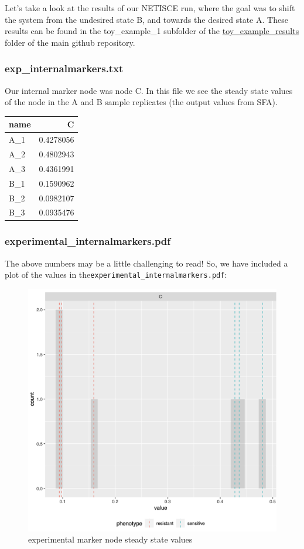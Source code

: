 \documentclass[
]{book}
\theoremstyle{definition}
\theoremstyle{definition}
\theoremstyle{definition}
\theoremstyle{definition}
\theoremstyle{remark}
\begin{document}
Let's take a look at the results of our NETISCE run, where the goal was to shift the system from the undesired state B, and towards the desired state A. These results can be found in the toy\_example\_1 subfolder of the \href{https://github.com/VeraLiconaResearchGroup/Netisce/tree/main/toy_example_results}{toy\_example\_results} folder of the main github repository.

\hypertarget{section-id}{%
\subsubsection*{exp\_internalmarkers.txt}\label{section-id}}

Our internal marker node was node C. In this file we see the steady state values of the node in the A and B sample replicates (the output values from SFA).

\begin{tabular}{l|r}
\hline
name & C\\
\hline
A\_1 & 0.4278056\\
\hline
A\_2 & 0.4802943\\
\hline
A\_3 & 0.4361991\\
\hline
B\_1 & 0.1590962\\
\hline
B\_2 & 0.0982107\\
\hline
B\_3 & 0.0935476\\
\hline
\end{tabular}

\hypertarget{section-id}{%
\subsubsection*{experimental\_internalmarkers.pdf}\label{section-id}}

The above numbers may be a little challenging to read! So, we have included a plot of the values in the\texttt{experimental\_internalmarkers.pdf}:

\begin{figure}

{\centering \includegraphics[width=0.5\linewidth]{images/expmarkers} 

}

\caption{experimental marker node steady state values}\label{fig:unnamed-chunk-9}
\end{figure}
\end{document}
